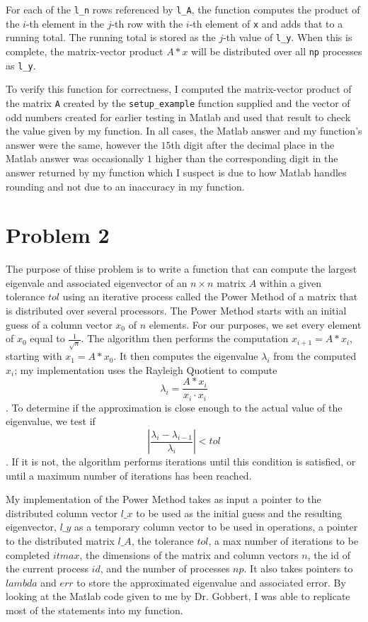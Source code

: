 \documentclass[11pt]{article}
\begin{document}
For each of the \texttt{l\_n} rows referenced by \texttt{l\_A}, the function computes the product of the $i$-th element in the $j$-th row with the $i$-th element of \texttt{x} and adds that to a running total. The running total is stored as the $j$-th value of \texttt{l\_y}. When this is complete, the matrix-vector product $A*x$ will be distributed over all \texttt{np} processes as \texttt{l\_y}.

To verify this function for correctness, I computed the matrix-vector product of the matrix \texttt{A} created by the \texttt{setup\_example} function supplied and the vector of odd numbers created for earlier testing in Matlab and used that result to check the value given by my function. In all cases, the Matlab answer and my function's answer were the same, however the $15$th digit after the decimal place in the Matlab answer was occasionally $1$ higher than the corresponding digit in the answer returned by my function which I suspect is due to how Matlab handles rounding and not due to an inaccuracy in my function.
\pagebreak
\section{Problem 2}
The purpose of thise problem is to write a function that can compute the largest eigenvale and associated eigenvector of an $n \times n$ matrix $A$ within a given tolerance $tol$ using an iterative process called the Power Method of a matrix that is distributed over several processors. The Power Method starts with an initial guess of a column vector $x_{0}$ of $n$ elements. For our purposes, we set every element of $x_{0}$ equal to $\frac{1}{\sqrt{n}}$. The algorithm then performs the computation $x_{i+1}=A*x_{i}$, starting with $x_{1}=A*x_{0}$. It then computes the eigenvalue $\lambda_{i}$ from the computed $x_{i}$; my implementation uses the Rayleigh Quotient to compute 
$$\lambda_{i}=\frac{A*x_{i}}{x_{i}\cdot x_{i}}$$.
To determine if the approximation is close enough to the actual value of the eigenvalue, we test if 
$$\left|\frac{\lambda_{i}-\lambda_{i-1}}{\lambda_{i}}\right| < tol$$. 
If it is not, the algorithm performs iterations until this condition is satisfied, or until a maximum number of iterations has been reached.

My implementation of the Power Method takes as input a pointer to the distributed column vector $l\_x$ to be used as the initial guess and the resulting eigenvector, $l\_y$ as a temporary column vector to be used in operations, a pointer to the distributed matrix $l\_A$, the tolerance $tol$, a max number of iterations to be completed $itmax$, the dimensions of the matrix and column vectors $n$, the id of the current process $id$, and the number of processes $np$. It also takes pointers to $lambda$ and $err$ to store the approximated eigenvalue and associated error. By looking at the Matlab code given to me by Dr. Gobbert, I was able to replicate most of the statements into my function.
\end{document}

